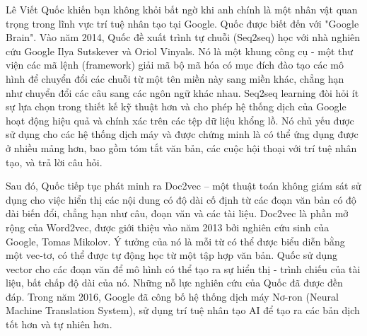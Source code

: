Lê Viết Quốc khiến bạn không khỏi bất ngờ khi anh chính là một nhân vật quan trọng trong lĩnh vực trí tuệ nhân tạo tại Google. Quốc được biết đến với "Google Brain".
Vào năm 2014, Quốc đề xuất trình tự chuỗi (Seq2seq) học với nhà nghiên cứu Google Ilya Sutskever và Oriol Vinyals. Nó là một khung công cụ - một thư viện các mã lệnh (framework) giải mã bộ mã hóa có mục đích đào tạo các mô hình để chuyển đổi các chuỗi từ một tên miền này sang miền khác, chẳng hạn như chuyển đổi các câu sang các ngôn ngữ khác nhau.
Seq2seq learning đòi hỏi ít sự lựa chọn trong thiết kế kỹ thuật hơn và cho phép hệ thống dịch của Google hoạt động hiệu quả và chính xác trên các tệp dữ liệu khổng lồ. Nó chủ yếu được sử dụng cho các hệ thống dịch máy và được chứng minh là có thể ứng dụng được ở nhiều mảng hơn, bao gồm tóm tắt văn bản, các cuộc hội thoại với trí tuệ nhân tạo, và trả lời câu hỏi.

Sau đó, Quốc tiếp tục phát minh ra Doc2vec – một thuật toán không giám sát sử dụng cho việc hiển thị các nội dung có độ dài cố định từ các đoạn văn bản có độ dài biến đổi, chẳng hạn như câu, đoạn văn và các tài liệu.
Doc2vec là phần mở rộng của Word2vec, được giới thiệu vào năm 2013 bởi nghiên cứu sinh của Google, Tomas Mikolov. Ý tưởng của nó là mỗi từ có thể được biểu diễn bằng một vec-tơ, có thể được tự động học từ một tập hợp văn bản. Quốc sử dụng vector cho các đoạn văn để mô hình có thể tạo ra sự hiển thị - trình chiếu của tài liệu, bất chấp độ dài của nó.
Những nỗ lực nghiên cứu của Quốc đã được đền đáp. Trong năm 2016, Google đã công bố hệ thống dịch máy Nơ-ron (Neural Machine Translation System), sử dụng trí tuệ nhân tạo AI để tạo ra các bản dịch tốt hơn và tự nhiên hơn.